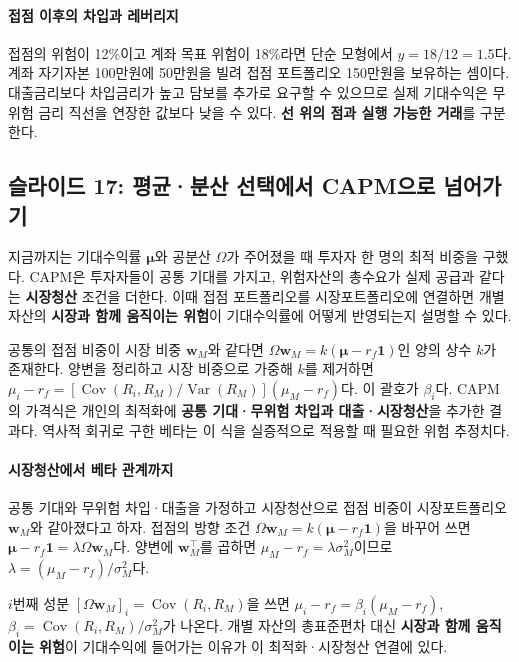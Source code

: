 \documentclass[11pt,a4paper]{article}
\begin{document}
\paragraph{접점 이후의 차입과 레버리지}

접점의 위험이 12\%이고 계좌 목표 위험이 18\%라면 단순 모형에서 $y=18/12=1.5$다. 계좌 자기자본 100만원에 50만원을 빌려 접점 포트폴리오 150만원을 보유하는 셈이다. 대출금리보다 차입금리가 높고 담보를 추가로 요구할 수 있으므로 실제 기대수익은 무위험 금리 직선을 연장한 값보다 낮을 수 있다. \textbf{선 위의 점과 실행 가능한 거래}를 구분한다.
\par

\subsection{슬라이드 17: 평균·분산 선택에서 CAPM으로 넘어가기}

지금까지는 기대수익률 $\boldsymbol\mu$와 공분산 $\Omega$가 주어졌을 때 투자자 한 명의 최적 비중을 구했다. CAPM은 투자자들이 공통 기대를 가지고, 위험자산의 총수요가 실제 공급과 같다는 \textbf{시장청산} 조건을 더한다. 이때 접점 포트폴리오를 시장포트폴리오에 연결하면 개별 자산의 \textbf{시장과 함께 움직이는 위험}이 기대수익률에 어떻게 반영되는지 설명할 수 있다.
\par

공통의 접점 비중이 시장 비중 $\mathbf w_M$와 같다면 $\Omega\mathbf w_M=k(\boldsymbol\mu-r_f\mathbf1)$인 양의 상수 $k$가 존재한다. 양변을 정리하고 시장 비중으로 가중해 $k$를 제거하면 $\mu_i-r_f=[\operatorname{Cov}(R_i,R_M)/\operatorname{Var}(R_M)](\mu_M-r_f)$다. 이 괄호가 $\beta_i$다. CAPM의 가격식은 개인의 최적화에 \textbf{공통 기대·무위험 차입과 대출·시장청산}을 추가한 결과다. 역사적 회귀로 구한 베타는 이 식을 실증적으로 적용할 때 필요한 위험 추정치다.
\par

\paragraph{시장청산에서 베타 관계까지}

공통 기대와 무위험 차입·대출을 가정하고 시장청산으로 접점 비중이 시장포트폴리오 $\mathbf w_M$와 같아졌다고 하자. 접점의 방향 조건 $\Omega\mathbf w_M=k(\boldsymbol\mu-r_f\mathbf1)$을 바꾸어 쓰면 $\boldsymbol\mu-r_f\mathbf1=\lambda\Omega\mathbf w_M$다. 양변에 $\mathbf w_M^\top$를 곱하면 $\mu_M-r_f=\lambda\sigma_M^2$이므로 $\lambda=(\mu_M-r_f)/\sigma_M^2$다.
\par

$i$번째 성분 $[\Omega\mathbf w_M]_i=\operatorname{Cov}(R_i,R_M)$을 쓰면 $\mu_i-r_f=\beta_i(\mu_M-r_f)$, $\beta_i=\operatorname{Cov}(R_i,R_M)/\sigma_M^2$가 나온다. 개별 자산의 총표준편차 대신 \textbf{시장과 함께 움직이는 위험}이 기대수익에 들어가는 이유가 이 최적화·시장청산 연결에 있다.
\par
\end{document}
